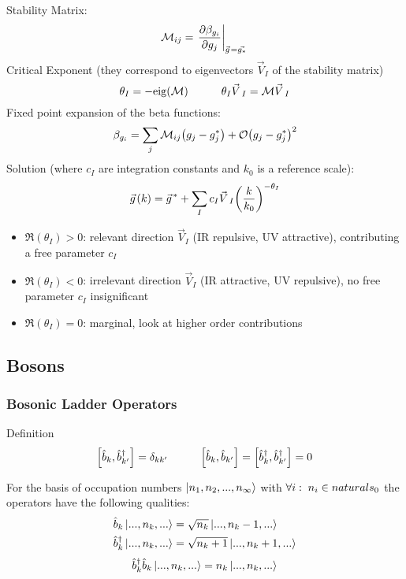 			\noindent
			Stability Matrix:
			\begin{equation}
				\mathcal{M}_{ij} = \eval{\pdv{\beta_{g_i}}{g_j}}_{\vec{g} = \vec{g_*}}
			\end{equation}
			Critical Exponent (they correspond to eigenvectors $\vec{V}_I$ of the stability matrix)
			\begin{equation}
				\theta_I = - \mathrm{eig}(\mathcal{M})
				\hsp \theta_I \vec{V}_I = \mathcal{M} \vec{V}_I
			\end{equation}
			Fixed point expansion of the beta functions:
			\begin{equation}
				\beta_{g_i} = \sum_{j} \mathcal{M}_{ij} \qty(g_j - g^{*}_{j}) + \mathcal{O}\qty(g_j - g^{*}_{j})^2
			\end{equation}
			Solution (where $c_I$ are integration constants and $k_0$ is a reference scale):
			\begin{equation}
				\vec{g}(k) = \vec{g}^{*} + \sum_I c_I \vec{V}_I \qty(\frac{k}{k_0})^{-\theta_I}
			\end{equation}
			\begin{itemize}
				\item $\Re(\theta_I) > 0$: relevant direction $\vec{V}_I$ (IR repulsive, UV attractive), contributing a free parameter $c_I$
				\item $\Re(\theta_I) < 0$: irrelevant direction $\vec{V}_I$ (IR attractive, UV repulsive), no free parameter $c_I$ insignificant
				\item $\Re(\theta_I) = 0$: marginal, look at higher order contributions
			\end{itemize}

	\subsection{Bosons}
		\subsubsection{Bosonic Ladder Operators}
			\label{Sec:BosonicCreationAndAnnihilationOperators}
			Definition
			\begin{equation}
				\comm{\hat{b}_k}{\hat{b}_{k'}^\dagger} = \delta_{kk'}
				\hsp
				\comm{\hat{b}_k}{\hat{b}_{k'}} = \comm{\hat{b}_k^\dagger}{\hat{b}_{k'}^\dagger} = 0
			\end{equation}

			\noindent
			For the basis of occupation numbers $\Ket{n_1, n_2, ..., n_\infty}$ with $\forall i:\;n_i\in \\naturals _0$ the operators have the following qualities:
			\begin{equation}
				\begin{aligned}
					\hat{b}_k \Ket{...,n_k,...} &= \sqrt{n_k} \Ket{...,n_k-1,...} \\
					\hat{b}_k^\dagger \Ket{...,n_k,...} &= \sqrt{n_k+1} \Ket{...,n_k+1,...} \\
				\end{aligned}
			\end{equation}
			\begin{equation}
				\hat{b}_k^\dagger \hat{b}_k \Ket{...,n_k,...} = n_k \Ket{...,n_k,...}
			\end{equation}


